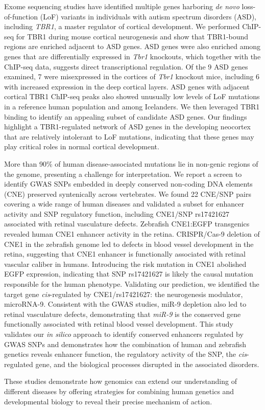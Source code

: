 Exome sequencing studies have identified multiple genes harboring \emph{de novo} loss-of-function (LoF) variants in individuals with autism spectrum disorders (ASD), including \emph{TBR1}, a master regulator of cortical development. We performed ChIP-seq for TBR1 during mouse cortical neurogenesis and show that TBR1-bound regions are enriched adjacent to ASD genes. ASD genes were also enriched among genes that are differentially expressed in \emph{Tbr1} knockouts, which together with the ChIP-seq data, suggests direct transcriptional regulation. Of the 9 ASD genes examined, 7 were misexpressed in the cortices of \emph{Tbr1} knockout mice, including 6 with increased expression in the deep cortical layers. ASD genes with adjacent cortical TBR1 ChIP-seq peaks also showed unusually low levels of LoF mutations in a reference human population and among Icelanders. We then leveraged TBR1 binding to identify an appealing subset of candidate ASD genes. Our findings highlight a TBR1-regulated network of ASD genes in the developing neocortex that are relatively intolerant to LoF mutations, indicating that these genes may play critical roles in normal cortical development.
%

More than 90\% of human disease-associated mutations lie in non-genic regions of the genome, presenting a challenge for interpretation. We report a screen to identify GWAS SNPs embedded in deeply conserved non-coding DNA elements (CNE) preserved syntenically across vertebrates. We found 22 CNE/SNP pairs covering a wide range of human diseases and validated a subset for enhancer activity and SNP regulatory function, including CNE1/SNP rs17421627 associated with retinal vasculature defects. Zebrafish CNE1:EGFP transgenics revealed human CNE1 enhancer activity in the retina. CRISPR/Cas-9 deletion of CNE1 in the zebrafish genome led to defects in blood vessel development in the retina, suggesting that CNE1 enhancer is functionally associated with retinal vascular caliber in humans. Introducing the risk mutation in CNE1 abolished EGFP expression, indicating that SNP rs17421627 is likely the causal mutation responsible for the human phenotype. Validating our prediction, we identified the target gene \emph{cis}-regulated by CNE1/rs17421627: the neurogenesis modulator, microRNA-9. Consistent with the GWAS studies, miR-9 depletion also led to retinal vasculature defects, demonstrating that \emph{miR-9} is the conserved gene functionally associated with retinal blood vessel development. This study validates our \emph{in silico} approach to identify conserved enhancers regulated by GWAS SNPs and demonstrates how the combination of human and zebrafish genetics reveals enhancer function, the regulatory activity of the SNP, the \emph{cis}-regulated gene, and the biological processes disrupted in the associated disorders.
%

These studies demonstrate how genomics can extend our understanding of different diseases by offering strategies for combining human genetics and developmental biology to reveal their precise mechanism of action.
